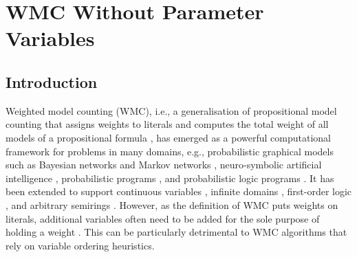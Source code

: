 \chapter{WMC Without Parameter Variables}\label{chapter:wmc2}

\section{Introduction}


Weighted model counting (WMC), i.e., a generalisation of propositional model
counting that assigns weights to literals and computes the total weight of all
models of a propositional formula \citep{DBLP:journals/ai/ChaviraD08}, has
emerged as a powerful computational framework for problems in many domains,
e.g., probabilistic graphical models such as Bayesian networks and Markov
networks
\citep{DBLP:conf/ecai/BartKLM16,DBLP:conf/ijcai/ChaviraD05,DBLP:conf/sat/ChaviraD06,DBLP:conf/kr/Darwiche02,DBLP:conf/aaai/SangBK05},
neuro-symbolic artificial intelligence \citep{DBLP:conf/icml/XuZFLB18},
probabilistic programs \citep{DBLP:journals/pacmpl/HoltzenBM20}, and
probabilistic logic programs \citep{DBLP:journals/tplp/FierensBRSGTJR15}. It has
been extended to support continuous variables \citep{DBLP:conf/ijcai/BellePB15},
infinite domains \citep{DBLP:conf/aaai/Belle17}, first-order logic
\citep{DBLP:journals/cacm/GogateD16,DBLP:conf/ijcai/BroeckTMDR11}, and arbitrary
semirings \citep{DBLP:journals/ijar/BelleR20,DBLP:journals/japll/KimmigBR17}.
However, as the definition of WMC puts weights on literals, additional variables
often need to be added for the sole purpose of holding a weight
\citep{DBLP:conf/ecai/BartKLM16,DBLP:conf/ijcai/ChaviraD05,DBLP:conf/sat/ChaviraD06,DBLP:conf/kr/Darwiche02,DBLP:conf/aaai/SangBK05}.
This can be particularly detrimental to WMC algorithms that rely on variable
ordering heuristics.

